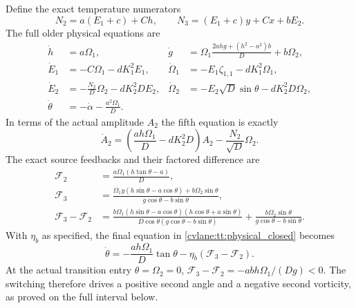 Define the exact temperature numerators
\begin{equation}\label{cvlane:tt:numerators}
 N_2=a(E_1+c)+Ch,\qquad
 N_3=(E_1+c)y+Cx+bE_2.
\end{equation}
The full older physical equations are
\begin{align}\label{cvlane:tt:physical_closed}
 \dot h&=a\Omega_1,&
 \dot g&=\Omega_1\frac{2ahg+(h^2-a^2)b}{D}+b\Omega_2,\\
 \dot E_1&=-C\Omega_1-dK_1^2E_1,&
 \dot\Omega_1&=-E_1\zeta_{1,1}-dK_1^2\Omega_1,\nonumber\\
 \dot E_2&=-\frac{N_2}{D}\Omega_2-dK_2^2DE_2,&
 \dot\Omega_2&=-E_2\sqrt D\sin\theta-dK_2^2D\Omega_2,\nonumber\\
 \dot\theta&=-\dot\alpha-\frac{a^2\Omega_1}{D}.&&\nonumber
\end{align}
In terms of the actual amplitude $A_2$ the fifth equation is exactly
\[
 \dot A_2=\left(\frac{ah\Omega_1}{D}-dK_2^2D\right)A_2
               -\frac{N_2}{\sqrt D}\Omega_2.
\]
The exact source feedbacks and their factored difference are
\begin{align}\label{cvlane:tt:feedback}
 \mathcal F_2&=\frac{a\Omega_1(h\tan\theta-a)}{D},\\
 \mathcal F_3&=
 \frac{\Omega_1y(h\sin\theta-a\cos\theta)+b\Omega_2\sin\theta}
      {g\cos\theta-b\sin\theta},\nonumber\\
 \mathcal F_3-\mathcal F_2
 &=\frac{b\Omega_1(h\sin\theta-a\cos\theta)
                  (h\cos\theta+a\sin\theta)}
         {D\cos\theta(g\cos\theta-b\sin\theta)}
     +\frac{b\Omega_2\sin\theta}{g\cos\theta-b\sin\theta}.\nonumber
\end{align}
With $\eta_b$ as specified, the final equation in
\eqref{cvlane:tt:physical_closed} becomes
\begin{equation}\label{cvlane:tt:angle}
 \dot\theta=-\frac{ah\Omega_1}{D}\tan\theta
                  -\eta_b(\mathcal F_3-\mathcal F_2).
\end{equation}
At the actual transition entry $\theta=\Omega_2=0$,
$\mathcal F_3-\mathcal F_2=-abh\Omega_1/(Dg)<0$.
The switching therefore drives a positive second angle and a negative
second vorticity, as proved on the full interval below.

